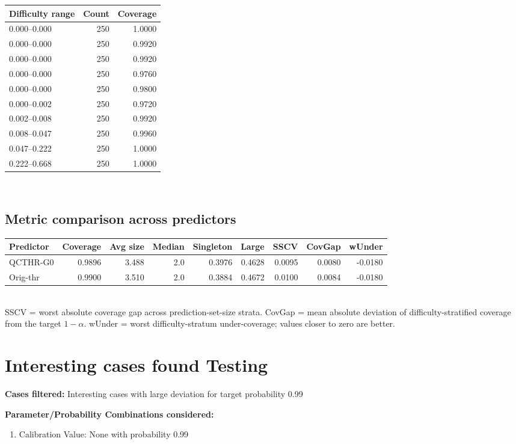 \documentclass[parskip=half]{scrartcl}
\begin{document}
\begin{tabular}{l r r}
\hline
Difficulty range & Count & Coverage \\
\hline
0.000--0.000 & 250 & 1.0000 \\
0.000--0.000 & 250 & 0.9920 \\
0.000--0.000 & 250 & 0.9920 \\
0.000--0.000 & 250 & 0.9760 \\
0.000--0.000 & 250 & 0.9800 \\
0.000--0.002 & 250 & 0.9720 \\
0.002--0.008 & 250 & 0.9920 \\
0.008--0.047 & 250 & 0.9960 \\
0.047--0.222 & 250 & 1.0000 \\
0.222--0.668 & 250 & 1.0000 \\
\hline
\end{tabular}\\[0.5em]
\subsection{Metric comparison across predictors}
\begin{tabular}{l r r r r r r r r}
\hline
Predictor & Coverage & Avg size & Median & Singleton & Large & SSCV & CovGap & wUnder \\
\hline
QCTHR-G0 & 0.9896 & 3.488 & 2.0 & 0.3976 & 0.4628 & 0.0095 & 0.0080 & -0.0180 \\
Orig-thr & 0.9900 & 3.510 & 2.0 & 0.3884 & 0.4672 & 0.0100 & 0.0084 & -0.0180 \\
\hline
\end{tabular}\\[0.5em]
\textsf{\scriptsize SSCV = worst absolute coverage gap across prediction-set-size strata. CovGap = mean absolute deviation of difficulty-stratified coverage from the target $1-\alpha$. wUnder = worst difficulty-stratum under-coverage; values closer to zero are better.}\\
\section{Interesting cases found Testing}
\textbf{Cases filtered:} Interesting cases with large deviation for target probability 0.99


\textbf{Parameter/Probability Combinations considered:}\begin{enumerate}
\item Calibration Value: None with probability 0.99
\end{enumerate}
        
\end{document}
